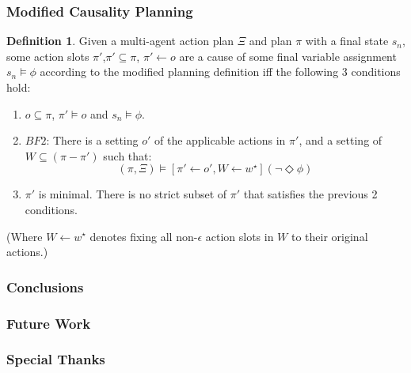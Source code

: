 \documentclass{beamer}
\theoremstyle{plain}
\theoremstyle{definition}
\newtheorem{defn}[thm]{Definition} %
\begin{document}
\begin{frame}
\frametitle{Modified Causality Planning}
\begin{defn}
Given a multi-agent action plan $\Xi$ and plan $\pi$ with a final state $s_n$, some action slots $\pi'$,$\pi' \subseteq \pi$, $\pi' \leftarrow o$ are a cause of some final variable assignment $s_n \models \phi$ according to the modified planning definition iff the following 3 conditions hold:
\begin{enumerate}
\item  $o \subseteq \pi$, $\pi' \models o$ and $s_n \models \phi$.
\item $BF2$: There is a setting $o'$ of the applicable actions in $\pi'$, and a setting of $W \subseteq (\pi  - \pi')$ such that:
\[
(\pi, \Xi) \models [\pi' \leftarrow o', W \leftarrow w^\star](\lnot \Diamond \phi)
\]
\item $\pi'$ is minimal. There is no strict subset of $\pi'$ that satisfies the previous 2 conditions.
\end{enumerate}


(Where $W\leftarrow w^\star$ denotes fixing all non-$\epsilon$ action slots in $W$ to their original actions.)

\end{defn}

\end{frame}




\begin{frame}
\frametitle{Conclusions}

\end{frame}


\begin{frame}
\frametitle{Future Work}

\end{frame}

\begin{frame}
\frametitle{Special Thanks}

\end{frame}
\end{document}
